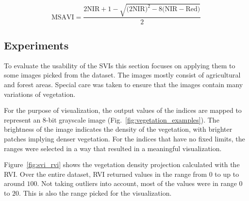 \begin{equation}
    \displaystyle
    \text{MSAVI} = \frac
    {
    2 \text{NIR} + 1
    - \sqrt{
    \big(2 \text{NIR}\big)^2
    - 8 \big(\text{NIR} - \text{Red}\big)
    }
    }
    {2}
    \label{eq:msavi}
\end{equation}

\subsection{Experiments}
To evaluate the usability of the SVIs this section focuses on applying them to some images picked from the dataset. The images mostly consist of agricultural and forest areas. Special care was taken to ensure that the images contain many variations of vegetation.

For the purpose of visualization, the output values of the indices are mapped to represent an 8-bit grayscale image (Fig.~\ref{fig:vegetation_examples}). The brightness of the image indicates the density of the vegetation, with brighter patches implying denser vegetation. For the indices that have no fixed limits, the ranges were selected in a way that resulted in a meaningful visualization.

Figure~\ref{fig:svi_rvi} shows the vegetation density projection calculated with the RVI. Over the entire dataset, RVI returned values in the range from $0$ to up to around $100$. Not taking outliers into account, most of the values were in range $0$ to $20$. This is also the range picked for the visualization.

